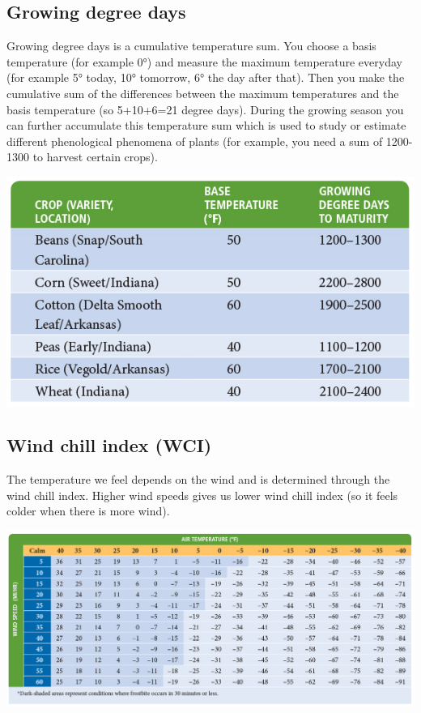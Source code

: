 \documentclass[12pt,oneside]{book}
\begin{document}
\subsection{Growing degree days}\label{growing-degree-days}

Growing degree days is a cumulative temperature sum. You choose a basis
temperature (for example 0°) and measure the maximum temperature
everyday (for example 5° today, 10° tomorrow, 6° the day after that).
Then you make the cumulative sum of the differences between the maximum
temperatures and the basis temperature (so 5+10+6=21 degree days).
During the growing season you can further accumulate this temperature
sum which is used to study or estimate different phenological phenomena
of plants (for example, you need a sum of 1200-1300 to harvest certain
crops).

\begin{center}
\label{table:GDD}

\begin{center}\includegraphics[width=0.8\linewidth]{figures/Table21} \end{center}
\end{center}

\subsection{Wind chill index (WCI)}\label{wind-chill-index-wci}

The temperature we feel depends on the wind and is determined through
the wind chill index. Higher wind speeds gives us lower wind chill index
(so it feels colder when there is more wind).

\begin{center}
\label{table:WC}

\begin{center}\includegraphics[width=0.8\linewidth]{figures/Table22} \end{center}
\end{center}
\end{document}

